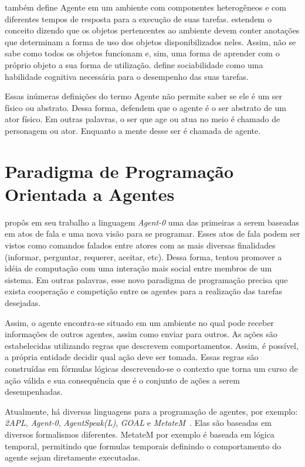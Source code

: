 \citeauthor{ingrand1992architecture} também define Agente em um ambiente com
componentes heterogêneos e com diferentes tempos de resposta para a execução
de suas tarefas. \citet{doyle1998annotated} estendem o conceito dizendo que os
objetos pertencentes ao ambiente devem conter anotações que determinam a forma
de uso dos objetos disponibilizados neles. Assim, não se sabe como todos os
objetos funcionam e, sim, uma forma de aprender com o próprio objeto a sua
forma de utilização. \citet{shoham1993agent} define sociabilidade como uma
habilidade cognitiva necessária para o desempenho das suas tarefas.

Essas inúmeras definições do termo Agente não permite saber se ele é um ser
físico ou abstrato. Dessa forma, \citet{nareyek2001review,damiano2008emotions}
defendem que o agente é o ser abstrato de um ator físico. Em outras palavras,
o ser que age ou atua no meio é chamado de personagem ou ator. Enquanto a
mente desse ser é chamada de agente.

\section{Paradigma de Programação Orientada a Agentes}

\citet{shoham1993agent} propôs em seu trabalho a linguagem \emph{Agent-0} uma
das primeiras a serem baseadas em atos de fala e uma nova visão para se
programar.  Esses atos de fala podem ser vistos como comandos falados entre
atores com as mais diversas finalidades (informar, perguntar, requerer,
aceitar, etc).  Dessa forma, \citeauthor{shoham1993agent} tentou promover a
idéia de computação com uma interação mais social entre membros de um sistema.
Em outras palavras, esse novo paradigma de programação precisa que exista
cooperação e competição entre os agentes para a realização das tarefas
desejadas.

Assim, o agente encontra-se situado em um ambiente no qual pode receber
informações de outros agentes, assim como enviar para outros.  As ações são
estabelecidas utilizando regras que descrevem comportamentos. Assim, é
possível, a própria entidade decidir qual ação deve ser tomada. Essas regras
são construídas em fórmulas lógicas descrevendo-se o contexto que torna um
curso de ação válida e sua consequência que é o conjunto de ações a serem
desempenhadas.

Atualmente, há diversas linguagens para a programação de agentes, por exemplo:
\emph{2APL}, \emph{Agent-0}, \emph{AgentSpeak(L)}, \emph{GOAL} e
\emph{MetateM}~\cite{bordini2009multi}. Elas são baseadas em diversos
formalismos diferentes. MetateM por exemplo é baseada em lógica temporal,
permitindo que formulas temporais definindo o comportamento do agente sejam
diretamente executadas.

